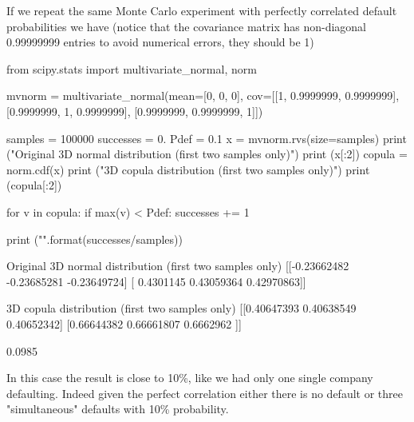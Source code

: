 If we repeat the same Monte Carlo experiment with perfectly correlated default probabilities we have (notice that the covariance matrix has non-diagonal 0.99999999 entries to avoid numerical errors, they should be 1)

\begin{ipython}
from scipy.stats import multivariate_normal, norm

mvnorm = multivariate_normal(mean=[0, 0, 0], cov=[[1, 0.9999999, 0.9999999],
                                                  [0.9999999, 1, 0.9999999],
                                                  [0.9999999, 0.9999999, 1]])  

samples = 100000
successes = 0.
Pdef = 0.1
x = mvnorm.rvs(size=samples)
print ("Original 3D normal distribution (first two samples only)")
print (x[:2])
copula = norm.cdf(x)
print ("\n3D copula distribution (first two samples only)")
print (copula[:2])

for v in copula:
    if max(v) < Pdef:
        successes += 1
        
print ("\n{}".format(successes/samples))
\end{ipython}
\begin{ioutput}
Original 3D normal distribution (first two samples only)
[[-0.23662482 -0.23685281 -0.23649724]
 [ 0.4301145   0.43059364  0.42970863]]

3D copula distribution (first two samples only)
[[0.40647393 0.40638549 0.40652342]
 [0.66644382 0.66661807 0.6662962 ]]

0.0985
\end{ioutput}
In this case the result is close to 10\%, like we had only one single company defaulting. 
Indeed given the perfect correlation either there is no default or three "simultaneous" defaults with 10\% probability.

